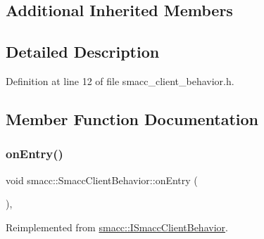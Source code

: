 \subsection*{Additional Inherited Members}


\subsection{Detailed Description}


Definition at line 12 of file smacc\+\_\+client\+\_\+behavior.\+h.



\subsection{Member Function Documentation}
\mbox{\label{classsmacc_1_1SmaccClientBehavior_ad5d3e1f1697c3cfe66c94cadba948493}} 
\subsubsection{\texorpdfstring{on\+Entry()}{onEntry()}}
{\footnotesize\ttfamily void smacc\+::\+Smacc\+Client\+Behavior\+::on\+Entry (\begin{DoxyParamCaption}{ }\end{DoxyParamCaption})\hspace{0.3cm}{\ttfamily [override]}, {\ttfamily [virtual]}}



Reimplemented from \hyperlink{classsmacc_1_1ISmaccClientBehavior_a9877684b1954429719826e2d0924d980}{smacc\+::\+I\+Smacc\+Client\+Behavior}.



